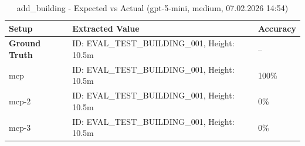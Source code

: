 \documentclass[a4paper,11pt]{article}
\begin{document}
\begin{table}[H]
\centering
\scriptsize
\caption{add\_building - Expected vs Actual (gpt-5-mini, medium, 07.02.2026 14:54)}
\begin{tabular}{l l l}
\toprule
Setup & Extracted Value & Accuracy \\
\midrule
\textbf{Ground Truth} & ID: EVAL\_TEST\_BUILDING\_001, Height: 10.5m & -- \\
\midrule
mcp & ID: EVAL\_TEST\_BUILDING\_001, Height: 10.5m & 100\% \\
mcp-2 & ID: EVAL\_TEST\_BUILDING\_001, Height: 10.5m & 0\% \\
mcp-3 & ID: EVAL\_TEST\_BUILDING\_001, Height: 10.5m & 0\% \\
\bottomrule
\end{tabular}
\end{table}

\clearpage
\end{document}
